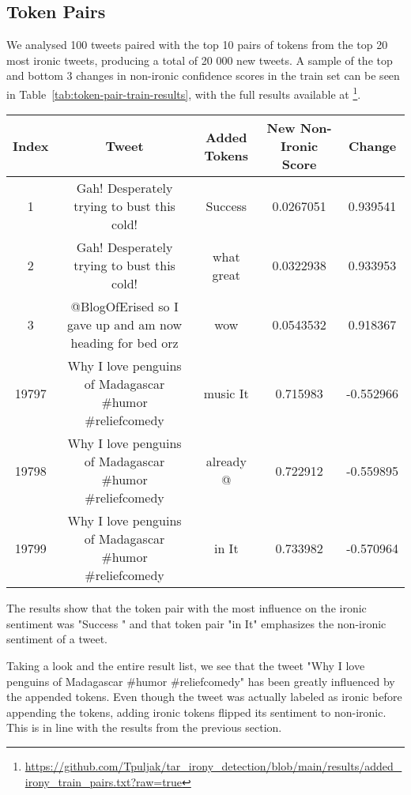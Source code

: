 \documentclass[10pt, a4paper]{article}
\begin{document}
\subsection{Token Pairs}

We analysed 100 tweets paired with the top 10 pairs of tokens from the top 20 most ironic tweets, producing a total of 20 000 new tweets.
A sample of the top and bottom 3 changes in non-ironic confidence scores in the train set can be seen in Table~\ref{tab:token-pair-train-results}, with the full results available at \footnote{\url{https://github.com/Tpuljak/tar_irony_detection/blob/main/results/added_irony_train_pairs.txt?raw=true}}.

\begin{table*}
\caption{Sample of Token Pair Results on the Train Set}
\label{tab:token-pair-train-results}
\begin{center}
\begin{tabular}{c|c|c|c|c}
\toprule
Index & Tweet & Added Tokens & New Non-Ironic Score & Change\\
\midrule
1     & Gah! Desperately trying to bust this cold!                & Success \textvisiblespace & 0.0267051 & 0.939541  \\
2     & Gah! Desperately trying to bust this cold!                & what great                & 0.0322938 & 0.933953  \\
3     & @BlogOfErised so I gave up and am now heading for bed orz & wow \textvisiblespace     & 0.0543532 & 0.918367  \\
19797 & Why I love penguins of Madagascar \#humor \#reliefcomedy  & music It                  & 0.715983  & -0.552966 \\
19798 & Why I love penguins of Madagascar \#humor \#reliefcomedy  & already @                 & 0.722912  & -0.559895 \\
19799 & Why I love penguins of Madagascar \#humor \#reliefcomedy  & in It                     & 0.733982  & -0.570964 \\
\bottomrule
\end{tabular}
\end{center}
\end{table*}

The results show that the token pair with the most influence on the ironic sentiment was "Success \textvisiblespace " and that token pair "in It" emphasizes the non-ironic sentiment of a tweet.

Taking a look and the entire result list, we see that the tweet "Why I love penguins of Madagascar  \#humor \#reliefcomedy" has been greatly influenced by the appended tokens.
Even though the tweet was actually labeled as ironic before appending the tokens, adding ironic tokens flipped its sentiment to non-ironic.
This is in line with the results from the previous section.
\end{document}
